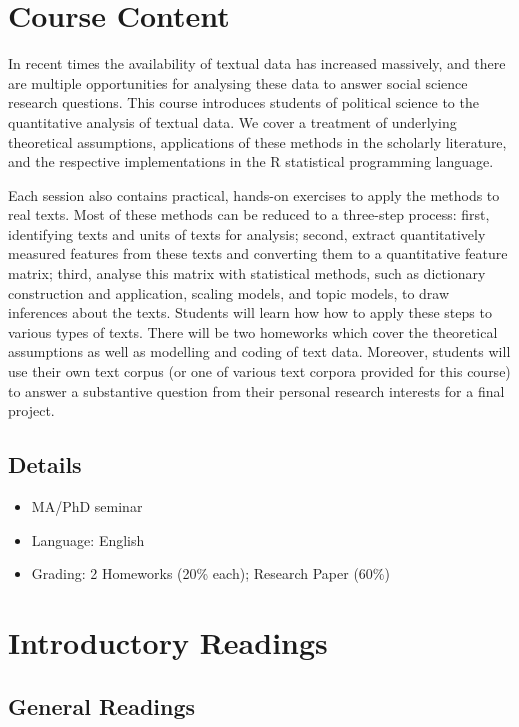 \documentclass[abstract=on,parskip=full,headings=standardclasses,fontsize=11pt,paper=a4]{scrartcl}
\begin{document}
\section*{Course Content}

In recent times the availability of textual data has increased massively, and there are multiple opportunities for analysing these data to answer social science research questions. This course introduces students of political science to the quantitative analysis of textual data. We cover a treatment of underlying theoretical assumptions, applications of these methods in the scholarly literature, and the respective implementations in the \textsf{R} statistical programming language.

Each session also contains practical, hands-on exercises to apply the methods to real texts. Most of these methods can be reduced to a three-step process: first, identifying texts and units of texts for analysis; second, extract quantitatively measured features from these texts and converting them to a quantitative feature matrix; third, analyse this matrix with statistical methods, such as dictionary construction and application, scaling models, and topic models, to draw inferences about the texts. Students will learn how how to apply these steps to various types of texts. There will be two homeworks which cover the theoretical assumptions as well as modelling and coding of text data. Moreover, students will use their own text corpus (or one of various text corpora provided for this course) to answer a substantive question from their personal research interests for a final project.


\subsection*{Details}

\begin{itemize}
\item MA/PhD seminar
\item  Language: English
\item Grading: 2 Homeworks (20\% each); Research Paper (60\%)
\end{itemize}



\section*{Introductory Readings}

\subsection*{General Readings}
\end{document}

